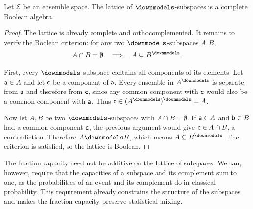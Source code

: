 \begin{mathSection}
	\begin{prop}
		Let $\Ens$ be an ensemble space. The lattice of $\separate$-subspaces is a complete Boolean algebra.
	\end{prop}
	
	\begin{proof}
		The lattice is already complete and orthocomplemented. It remains to verify the Boolean criterion: for any two $\separate$-subspaces $A,B$,
		\begin{equation}
			A \cap B = \emptyset \quad \Longrightarrow \quad A \subseteq B^{\separate}.
		\end{equation}
		
		First, every $\separate$-subspace contains all components of its elements. Let $\ens[a] \in A$ and let $\ens[c]$ be a component of $\ens[a]$. Every ensemble in $A^{\separate}$ is separate from $\ens[a]$ and therefore from $\ens[c]$, since any common component with $\ens[c]$ would also be a common component with $\ens[a]$. Thus $\ens[c] \in (A^{\separate})^{\separate}=A$.
		
		Now let $A,B$ be two $\separate$-subspaces with $A \cap B = \emptyset$. If $\ens[a] \in A$ and $\ens[b] \in B$ had a common component $\ens[c]$, the previous argument would give $\ens[c] \in A \cap B$, a contradiction. Therefore $A \separate B$, which means $A \subseteq B^{\separate}$. The criterion is satisfied, so the lattice is Boolean.
	\end{proof}
\end{mathSection}

The fraction capacity need not be additive on the lattice of subspaces. We can, however, require that the capacities of a subspace and its complement sum to one, as the probabilities of an event and its complement do in classical probability. This requirement already constrains the structure of the subspaces and makes the fraction capacity preserve statistical mixing.

